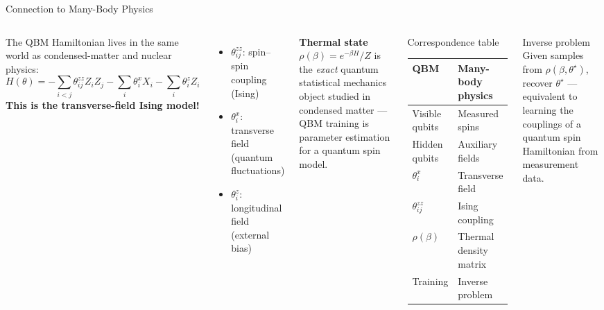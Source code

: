 \documentclass[aspectratio=169,10pt]{beamer}
\begin{document}
\begin{frame}{Connection to Many-Body Physics}
  \begin{columns}[T]
      The QBM Hamiltonian lives in the same world as
      condensed-matter and nuclear physics:
      \[
        H(\theta) = -\sum_{i<j}\theta_{ij}^{zz}Z_iZ_j
                    -\sum_i\theta_i^x X_i
                    -\sum_i\theta_i^z Z_i
      \]
      \textbf{This is the transverse-field Ising model!}
      \begin{itemize}
        \item $\theta_{ij}^{zz}$: spin--spin coupling (Ising)
        \item $\theta_i^x$: transverse field (quantum fluctuations)
        \item $\theta_i^z$: longitudinal field (external bias)
      \end{itemize}

      \textbf{Thermal state} $\rho(\beta)=e^{-\beta H}/Z$ is the
      \emph{exact} quantum statistical mechanics object studied
      in condensed matter — QBM training is parameter estimation
      for a quantum spin model.
      \begin{block}{Correspondence table}
        \begin{tabular}{ll}
          \toprule
          QBM & Many-body physics \\
          \midrule
          Visible qubits & Measured spins \\
          Hidden qubits & Auxiliary fields \\
          $\theta_i^x$ & Transverse field \\
          $\theta_{ij}^{zz}$ & Ising coupling \\
          $\rho(\beta)$ & Thermal density matrix \\
          Training & Inverse problem \\
          \bottomrule
        \end{tabular}
      \end{block}
      \vspace{0.2cm}
      \begin{alertblock}{Inverse problem}
        Given samples from $\rho(\beta,\theta^\star)$,
        recover $\theta^\star$ — equivalent to learning
        the couplings of a quantum spin Hamiltonian from
        measurement data.
      \end{alertblock}
  \end{columns}
\end{frame}
\end{document}
